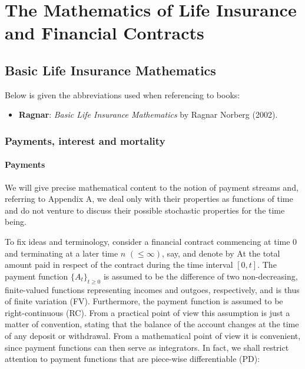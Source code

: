 \documentclass[a4paper,12pt,openany]{book}
\providecommand{\tightlist}{%
 \setlength{\itemsep}{0pt}\setlength{\parskip}{0pt}}
\begin{document}
\hypertarget{part-the-mathematics-of-life-insurance-and-financial-contracts}{%
\part{The Mathematics of Life Insurance and Financial Contracts}\label{part-the-mathematics-of-life-insurance-and-financial-contracts}}

\hypertarget{basic-life-insurance-mathematics}{%
\chapter{Basic Life Insurance Mathematics}\label{basic-life-insurance-mathematics}}

Below is given the abbreviations used when referencing to books:

\begin{itemize}
\tightlist
\item
  \textbf{Ragnar}: \emph{Basic Life Insurance Mathematics} by Ragnar Norberg (2002).\cite{norberg2002}
\end{itemize}

\hypertarget{payments-interest-and-mortality}{%
\section{Payments, interest and mortality}\label{payments-interest-and-mortality}}

\hypertarget{payments}{%
\subsection{Payments}\label{payments}}

We will give precise mathematical content to the notion of payment streams and, referring to Appendix A, we deal only with their properties as functions of time and do not venture to discuss their possible stochastic properties for the time being.

To fix ideas and terminology, consider a financial contract commencing at time 0 and terminating at a later time \(n\) \((\le \infty)\), say, and denote by At the total amount paid in respect of the contract during the time interval \([0, t]\). The payment function \(\{A_t\}_{t\ge 0}\) is assumed to be the difference of two non-decreasing, finite-valued functions representing incomes and outgoes, respectively, and is thus of finite variation (FV). Furthermore, the payment function is assumed to be right-continuous (RC). From a practical point of view this assumption is just a matter of convention, stating that the balance of the account changes at the time of any deposit or withdrawal. From a mathematical point of view it is convenient, since payment functions can then serve as integrators. In fact, we shall restrict attention to payment functions that are piece-wise differentiable (PD):
\end{document}
